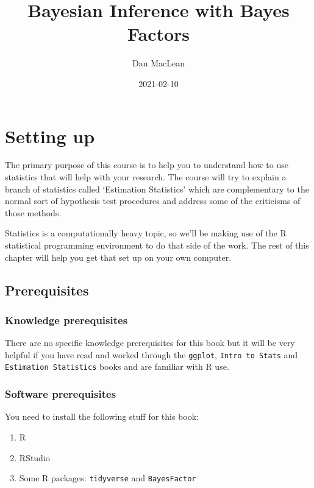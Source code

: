 \documentclass[
]{book}
\title{Bayesian Inference with Bayes Factors}
\author{Dan MacLean}
\date{2021-02-10}
\providecommand{\tightlist}{%
  \setlength{\itemsep}{0pt}\setlength{\parskip}{0pt}}
\begin{document}
\maketitle

{
\setcounter{tocdepth}{1}
\tableofcontents
}
\hypertarget{setting-up}{%
\chapter{Setting up}\label{setting-up}}

The primary purpose of this course is to help you to understand how to use statistics that will help with your research. The course will try to explain a branch of statistics called `Estimation Statistics' which are complementary to the normal sort of hypothesis test procedures and address some of the criticisms of those methods.

Statistics is a computationally heavy topic, so we'll be making use of the R statistical programming environment to do that side of the work. The rest of this chapter will help you get that set up on your own computer.

\hypertarget{prerequisites}{%
\section{Prerequisites}\label{prerequisites}}

\hypertarget{knowledge-prerequisites}{%
\subsection{Knowledge prerequisites}\label{knowledge-prerequisites}}

There are no specific knowledge prerequisites for this book but it will be very helpful if you have read and worked through the \texttt{ggplot}, \texttt{Intro\ to\ Stats} and \texttt{Estimation\ Statistics} books and are familiar with R use.

\hypertarget{software-prerequisites}{%
\subsection{Software prerequisites}\label{software-prerequisites}}

You need to install the following stuff for this book:

\begin{enumerate}
\def\labelenumi{\arabic{enumi}.}
\tightlist
\item
  R
\item
  RStudio
\item
  Some R packages: \texttt{tidyverse} and \texttt{BayesFactor}
\end{enumerate}
\end{document}
